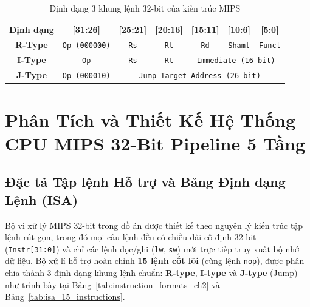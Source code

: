 \documentclass[12pt,a4paper]{report}
\begin{document}
\begin{table}[H]
\centering
\caption{Định dạng 3 khung lệnh 32-bit của kiến trúc MIPS}
\label{tab:instruction_formats}
\begin{tabular}{@{}ccccccc@{}}
\toprule
\textbf{Định dạng} & \textbf{[31:26]} & \textbf{[25:21]} & \textbf{[20:16]} & \textbf{[15:11]} & \textbf{[10:6]} & \textbf{[5:0]} \\ \midrule
\textbf{R-Type} & \texttt{Op (000000)} & \texttt{Rs} & \texttt{Rt} & \texttt{Rd} & \texttt{Shamt} & \texttt{Funct} \\
\textbf{I-Type} & \texttt{Op} & \texttt{Rs} & \texttt{Rt} & \multicolumn{3}{c}{\texttt{Immediate (16-bit)}} \\
\textbf{J-Type} & \texttt{Op (000010)} & \multicolumn{5}{c}{\texttt{Jump Target Address (26-bit)}} \\ \bottomrule
\end{tabular}
\end{table}

\chapter{Phân Tích và Thiết Kế Hệ Thống CPU MIPS 32-Bit Pipeline 5 Tầng}

\section{Đặc tả Tập lệnh Hỗ trợ và Bảng Định dạng Lệnh (ISA)}

Bộ vi xử lý MIPS 32-bit trong đồ án được thiết kế theo nguyên lý kiến trúc tập lệnh rút gọn, trong đó mọi câu lệnh đều có chiều dài cố định 32-bit (\texttt{Instr[31:0]}) và chỉ các lệnh đọc/ghi (\texttt{lw}, \texttt{sw}) mới trực tiếp truy xuất bộ nhớ dữ liệu. Bộ xử lí hỗ trợ hoàn chỉnh \textbf{15 lệnh cốt lõi} (cùng lệnh \texttt{nop}), được phân chia thành 3 định dạng khung lệnh chuẩn: \textbf{R-type}, \textbf{I-type} và \textbf{J-type} (Jump) như trình bày tại Bảng~\ref{tab:instruction_formats_ch2} và Bảng~\ref{tab:isa_15_instructions}.
\end{document}
